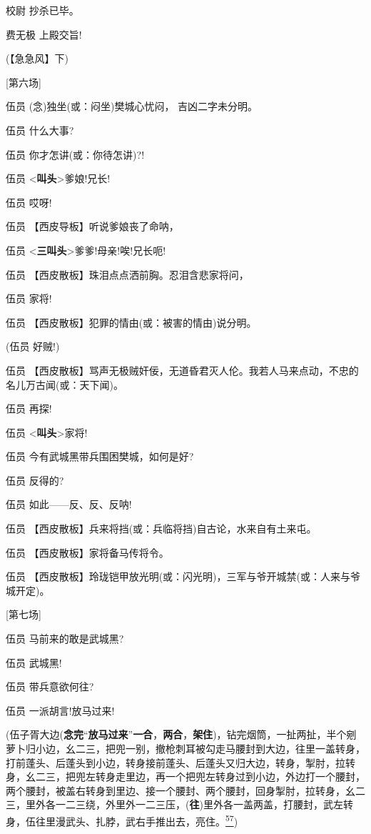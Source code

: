 校尉 抄杀已毕。

费无极 上殿交旨!

(【急急风】下)

{[}第六场{]}

伍员 (念)独坐(或：闷坐)樊城心忧闷， 吉凶二字未分明。

伍员 什么大事?

伍员 你才怎讲(或：你待怎讲)?!

伍员 \textless{}\textbf{叫头}\textgreater{}爹娘!兄长!

伍员 哎呀!

伍员 【西皮导板】听说爹娘丧了命呐，

伍员 \textless{}\textbf{三叫头}\textgreater{}爹爹!母亲!唉!兄长呃!

伍员 【西皮散板】珠泪点点洒前胸。忍泪含悲家将问，

伍员 家将!

伍员 【西皮散板】犯罪的情由(或：被害的情由)说分明。

(伍员 好贼!)

伍员
【西皮散板】骂声无极贼奸佞，无道昏君灭人伦。我若人马来点动，不忠的名儿万古闻(或：天下闻)。

伍员 再探!

伍员 \textless{}\textbf{叫头}\textgreater{}家将!

伍员 今有武城黑带兵围困樊城，如何是好?

伍员 反得的?

伍员 如此------反、反、反呐!

伍员 【西皮散板】兵来将挡(或：兵临将挡)自古论，水来自有土来屯。

伍员 【西皮散板】家将备马传将令。

伍员
【西皮散板】玲珑铠甲放光明(或：闪光明)，三军与爷开城禁(或：人来与爷城开定)。

{[}第七场{]}

伍员 马前来的敢是武城黑?

伍员 武城黑!

伍员 带兵意欲何往?

伍员 一派胡言!放马过来!

(伍子胥大边(\textbf{念完}``\textbf{放马过来}''\textbf{一合}，\textbf{两合}，\textbf{架住})，钻完烟筒，一扯两扯，半个剜萝卜归小边，幺二三，把兜一别，撤枪刺耳被勾走马腰封到大边，往里一盖转身，打前蓬头、后蓬头到小边，转身接前蓬头、后蓬头又归大边，转身，掣肘，拉转身，幺二三，把兜左转身走里边，再一个把兜左转身过到小边，外边打一个腰封，两个腰封，被盖右转身到里边、接一个腰封、两个腰封，回身掣肘，拉转身，幺二三，里外各一二三绕，外里外一二三压，(\textbf{往})里外各一盖两盖，打腰封，武左转身，伍往里漫武头、扎脖，武右手推出去，亮住。\protect\hyperlink{fn57}{\textsuperscript{57}})

